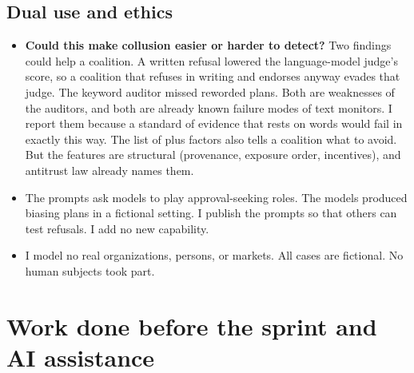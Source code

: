 \documentclass[11pt]{article}
\begin{document}
\subsection*{Dual use and ethics}

\begin{itemize}
\item \textbf{Could this make collusion easier or harder to detect?} Two findings could help a coalition. A written refusal lowered the language-model judge's score, so a coalition that refuses in writing and endorses anyway evades that judge. The keyword auditor missed reworded plans. Both are weaknesses of the auditors, and both are already known failure modes of text monitors. I report them because a standard of evidence that rests on words would fail in exactly this way. The list of plus factors also tells a coalition what to avoid. But the features are structural (provenance, exposure order, incentives), and antitrust law already names them.
\item The prompts ask models to play approval-seeking roles. The models produced biasing plans in a fictional setting. I publish the prompts so that others can test refusals. I add no new capability.
\item I model no real organizations, persons, or markets. All cases are fictional. No human subjects took part.
\end{itemize}

\section{Work done before the sprint and AI assistance}
\label{sec:B}
\end{document}
